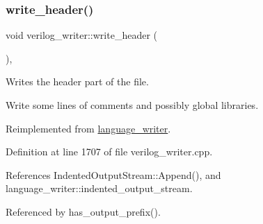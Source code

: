 \subsubsection{\texorpdfstring{write\+\_\+header()}{write\_header()}}
{\footnotesize\ttfamily void verilog\+\_\+writer\+::write\+\_\+header (\begin{DoxyParamCaption}{ }\end{DoxyParamCaption})\hspace{0.3cm}{\ttfamily [override]}, {\ttfamily [virtual]}}



Writes the header part of the file. 

Write some lines of comments and possibly global libraries. 

Reimplemented from \hyperlink{classlanguage__writer_a3e96d627983817f9b84f72cc1fa8bb4f}{language\+\_\+writer}.



Definition at line 1707 of file verilog\+\_\+writer.\+cpp.



References Indented\+Output\+Stream\+::\+Append(), and language\+\_\+writer\+::indented\+\_\+output\+\_\+stream.



Referenced by has\+\_\+output\+\_\+prefix().

